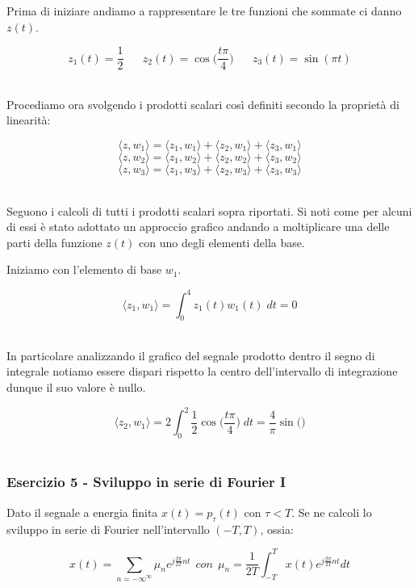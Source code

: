 \documentclass[../main.tex]{subfiles}
\begin{document}
Prima di iniziare andiamo a rappresentare le tre funzioni che sommate ci danno $z(t)$.

\[ z_1(t) = \frac{1}{2} \hspace{20pt} z_2(t) = \cos\bigg(\frac{t \pi}{4} \bigg) \hspace{20pt} z_3(t) = \sin(\pi t) \]\ 

Procediamo ora svolgendo i prodotti scalari così definiti secondo la proprietà di linearità:

\[ \langle z, w_1 \rangle = \langle z_1, w_1 \rangle + \langle z_2, w_1  \rangle + \langle z_3, w_1 \rangle \]
\[ \langle z, w_2 \rangle = \langle z_1, w_2 \rangle + \langle z_2, w_2  \rangle + \langle z_3, w_2 \rangle \]
\[ \langle z, w_3 \rangle = \langle z_1, w_3 \rangle + \langle z_2, w_3  \rangle + \langle z_3, w_3 \rangle \]\

Seguono i calcoli di tutti i prodotti scalari sopra riportati.
Si noti come per alcuni di essi è stato adottato un approccio grafico andando a moltiplicare una delle parti della funzione $z(t)$ con uno degli elementi della base.

Iniziamo con l'elemento di base $w_1$.


\[ \langle z_1, w_1 \rangle = \int_0^4 z_1(t) w_1(t) \; dt = 0\]\

In particolare analizzando il grafico del segnale prodotto dentro il segno di integrale notiamo essere dispari rispetto la centro dell'intervallo di integrazione dunque il suo valore è nullo.


\[ \langle z_2, w_1 \rangle = 2 \int_0^2 \frac{1}{2} \cos\bigg( \frac{t \pi}{4}\bigg)\; dt = \frac{4}{\pi} \sin \bigg( \bigg) \]\












\vspace*{1.5cm}
\subsubsection{Esercizio 5 - Sviluppo in serie di Fourier I}
\label{ss15}

Dato il segnale a energia finita $x(t) = p_\tau(t)$ con $\tau < T$. Se ne calcoli lo sviluppo in serie di Fourier nell'intervallo $(-T, T)$, ossia:

\[x(t) = \sum_{n = -\infty^\infty} \mu_n e^{j \frac{2 \pi}{2T}nt} \:\:\unit{con} \:\: \mu_n = \frac{1}{2T} \int_{-T}^T x(t) e^{j \frac{2 \pi}{2T}nt}  dt\]\
\end{document}
